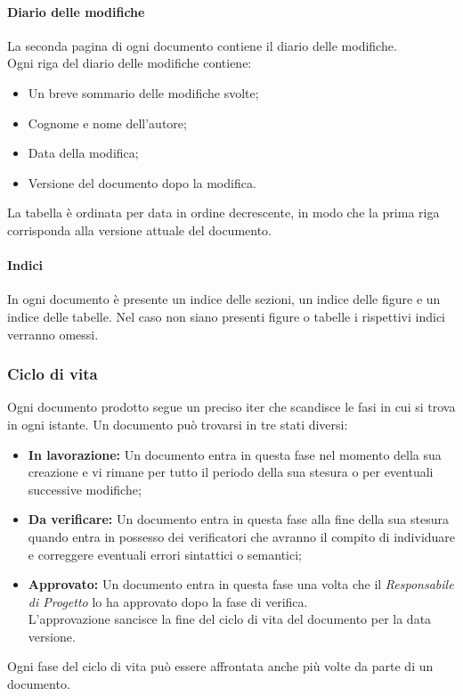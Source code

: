       \paragraph{Diario delle modifiche}
        La seconda pagina di ogni documento contiene il diario delle modifiche.\\
        Ogni riga del diario delle modifiche contiene:
        \begin{itemize}
          \item Un breve sommario delle modifiche svolte;
          \item Cognome e nome dell’autore;
          \item Data della modifica;
          \item Versione del documento dopo la modifica.
        \end{itemize}
        La tabella è ordinata per data in ordine decrescente, in modo che la prima riga corrisponda alla versione attuale del documento.
      \paragraph{Indici}
        In ogni documento è presente un indice delle sezioni, un indice delle figure e un indice delle tabelle. Nel caso non siano presenti figure o tabelle i rispettivi indici verranno omessi.        

    \subsubsection{Ciclo di vita}\label{subsec:ciclovita}
      Ogni documento prodotto segue un preciso iter che scandisce le fasi in cui si trova in ogni istante. Un documento può trovarsi in tre stati diversi:\\
      \begin{itemize}
        \item \textbf{In lavorazione: }Un documento entra in questa fase nel momento della sua creazione e vi rimane per tutto il periodo della sua stesura
          o per eventuali successive modifiche;
        \item \textbf{Da verificare: }Un documento entra in questa fase alla fine della sua stesura quando entra in possesso dei verificatori che avranno il compito
          di individuare e correggere eventuali errori sintattici o semantici;
        \item \textbf{Approvato: }Un documento entra in questa fase una volta che il \emph{Responsabile di Progetto} lo ha approvato dopo la fase di verifica.\\
          L'approvazione sancisce la fine del ciclo di vita del documento per la data versione.
      \end{itemize}
      Ogni fase del ciclo di vita può essere affrontata anche più volte da parte di un documento.
